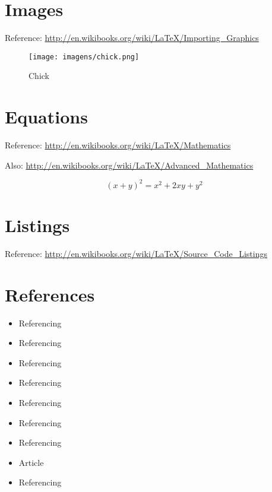 \section{Images}\label{sec:LABEL_CHP_2_SEC_B}
Reference: \url{http://en.wikibooks.org/wiki/LaTeX/Importing_Graphics}

\begin{figure}
  \centering
  \texttt{[image: imagens/chick.png]}
  \caption{Chick}
  \label{fig:LABEL_FIG_1}
\end{figure}

\section{Equations}\label{sec:LABEL_CHP_2_SEC_C}
Reference: \url{http://en.wikibooks.org/wiki/LaTeX/Mathematics}

Also: \url{http://en.wikibooks.org/wiki/LaTeX/Advanced_Mathematics}

\begin{equation}
  (x + y)^2 = x^2 + 2xy + y^2
  \label{eq:LABEL_EQ_1}
\end{equation}

\section{Listings}\label{sec:LABEL_CHP_2_SEC_D}
Reference: \url{http://en.wikibooks.org/wiki/LaTeX/Source_Code_Listings}



\section{References}\label{sec:LABEL_CHP_2_SEC_E}
\begin{itemize}
  \item Referencing 
  \item Referencing 
  \item Referencing 
  \item Referencing 
  \item Referencing 
  \item Referencing 
  \item Referencing 
  \item Article \cite{braida2015transforming}
  \item Referencing 
\end{itemize}
